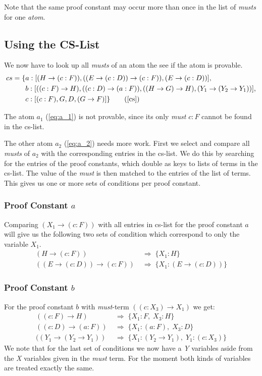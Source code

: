 Note that the same proof constant may occur more than once in the list of \emph{musts} for one \emph{atom}. 

\subsection{Using the CS-List}
We now have to look up all \emph{musts} of an atom the see if the atom is provable.
\begin{align*}
	cs = \{& a: [(H \rightarrow (c:F)), ((E \rightarrow (c:D)) \rightarrow (c:F)), (E \rightarrow (c:D))],\\
	& b: [((c:F) \rightarrow H), ((c:D) \rightarrow (a:F)), ((H \rightarrow G) \rightarrow H), (Y_1 \rightarrow (Y_2 \rightarrow Y_1))],\\
	& c: [(c:F), G, D, (G \rightarrow F)]\}
	\tag{\ref{cs}}
\end{align*}

The atom $a_1$ (\ref{eq:a_1}) is not provable, since its only \emph{must} $c:F$ cannot be found in the cs-list.

The other atom $a_2$ (\ref{eq:a_2}) needs more work. First we select and compare all \emph{musts} of $a_2$ with the corresponding entries in the cs-list. We do this by searching for the entries of the proof constants, which double as keys to lists of terms in the cs-list. The value of the \emph{must} is then matched to the entries of the list of terms. This gives us one or more sets of conditions per proof constant.  

\subsubsection[look up proof constant a]{Proof Constant $a$}
Comparing $(X_1 \rightarrow (c:F))$ with all entries in cs-list for the proof constant $a$ will give us the following two sets of condition which correspond to only the variable $X_1$.
\begin{align}
	(H \rightarrow (c:F)) & \; \Rightarrow \; \{X_1: H\} \nonumber\\ 
	((E \rightarrow (c:D)) \rightarrow (c:F)) & \; \Rightarrow  \; \{X_1: (E \rightarrow (c:D))\} \label{condition:a}
\end{align}

\subsubsection[look up proof constant b]{Proof Constant $b$}
For the proof constant $b$ with \emph{must}-term $((c:X_3) \rightarrow X_1)$ we get:
\begin{align}
	((c:F) \rightarrow H) & \; \Rightarrow \; \{X_1: F,\; X_3: H\}\nonumber\\ 
	((c:D) \rightarrow (a:F)) & \; \Rightarrow \; \{X_1: (a:F),\; X_3: D\}\nonumber\\ 
	((Y_1 \rightarrow (Y_2 \rightarrow Y_1)) & \; \Rightarrow \; \{X_1: (Y_2 \rightarrow Y_1),\; Y_1: (c:X_3)\} \label{condition:b}
\end{align}
We note that for the last set of conditions we now have a \emph{Y} variables aside from the \emph{X} variables given in the \emph{must} term. For the moment both kinds of variables are treated exactly the same.


